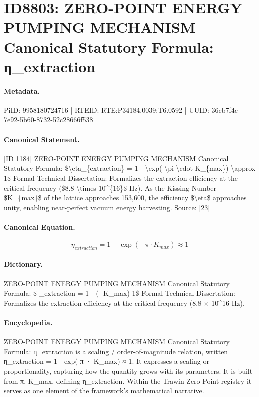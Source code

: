 \section*{ID8803: ZERO-POINT ENERGY PUMPING MECHANISM Canonical Statutory Formula: η\_extraction}
\paragraph{Metadata.}
PiID: 9958180724716 | RTEID: RTE:P34184.0039:T6.0592 | UUID: 36cb7f4c-7e92-5b60-8732-52c28666f538

\paragraph{Canonical Statement.}
[ID 1184] ZERO-POINT ENERGY PUMPING MECHANISM Canonical Statutory Formula: \$\textbackslash{}eta\_\{extraction\} = 1 - \textbackslash{}exp(-\textbackslash{}pi \textbackslash{}cdot K\_\{max\}) \textbackslash{}approx 1\$ Formal Technical Dissertation: Formalizes the extraction efficiency at the critical frequency (\$8.8 \textbackslash{}times 10\textasciicircum{}\{16\}\$ Hz). As the Kissing Number \$K\_\{max\}\$ of the lattice approaches 153,600, the efficiency \$\textbackslash{}eta\$ approaches unity, enabling near-perfect vacuum energy harvesting. Source: [23]

\paragraph{Canonical Equation.}
\[
\eta_{extraction} = 1 - \exp(-\pi \cdot K_{max}) \approx 1
\]

\paragraph{Dictionary.}
ZERO-POINT ENERGY PUMPING MECHANISM Canonical Statutory Formula: \$ \_extraction = 1 - (- K\_max) 1\$ Formal Technical Dissertation: Formalizes the extraction efficiency at the critical frequency (8.8 × 10\textasciicircum{}16 Hz).

\paragraph{Encyclopedia.}
ZERO-POINT ENERGY PUMPING MECHANISM Canonical Statutory Formula: η\_extraction is a scaling / order-of-magnitude relation, written η\_extraction = 1 - exp(-π · K\_max) ≈ 1. It expresses a scaling or proportionality, capturing how the quantity grows with its parameters. It is built from π, K\_max, defining η\_extraction. Within the Trawin Zero Point registry it serves as one element of the framework's mathematical narrative.

